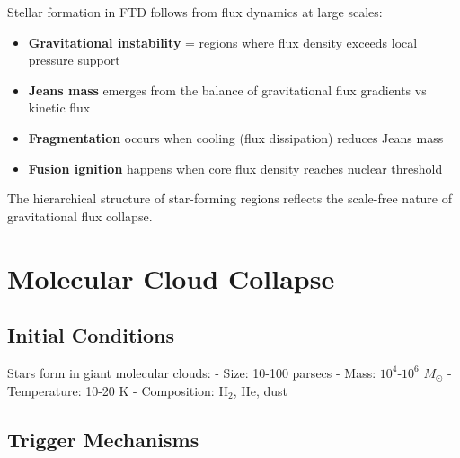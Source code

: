 \documentclass[
  11pt,
  letterpaper,
  twoside,
  openright]{book}
\providecommand{\tightlist}{%
  \setlength{\itemsep}{0pt}\setlength{\parskip}{0pt}}
\begin{document}
\begin{tcolorbox}[enhanced jigsaw, coltitle=black, colbacktitle=quarto-callout-note-color!10!white, toprule=.15mm, colframe=quarto-callout-note-color-frame, arc=.35mm, opacityback=0, bottomtitle=1mm, toptitle=1mm, breakable, colback=white, titlerule=0mm, opacitybacktitle=0.6, title=\textcolor{quarto-callout-note-color}{\faInfo}\hspace{0.5em}{How FTD Produces Stellar Formation}, rightrule=.15mm, bottomrule=.15mm, leftrule=.75mm, left=2mm]

Stellar formation in FTD follows from flux dynamics at large scales:

\begin{itemize}
\tightlist
\item
  \textbf{Gravitational instability} = regions where flux density
  exceeds local pressure support
\item
  \textbf{Jeans mass} emerges from the balance of gravitational flux
  gradients vs kinetic flux
\item
  \textbf{Fragmentation} occurs when cooling (flux dissipation) reduces
  Jeans mass
\item
  \textbf{Fusion ignition} happens when core flux density reaches
  nuclear threshold
\end{itemize}

The hierarchical structure of star-forming regions reflects the
scale-free nature of gravitational flux collapse.

\end{tcolorbox}

\section{Molecular Cloud Collapse}\label{molecular-cloud-collapse}

\subsection{Initial Conditions}\label{initial-conditions}

Stars form in giant molecular clouds: - Size: 10-100 parsecs - Mass:
\(10^4\)-\(10^6\) \(M_\odot\) - Temperature: 10-20 K - Composition:
\(\text{H}_2\), He, dust

\subsection{Trigger Mechanisms}\label{trigger-mechanisms}
\end{document}
